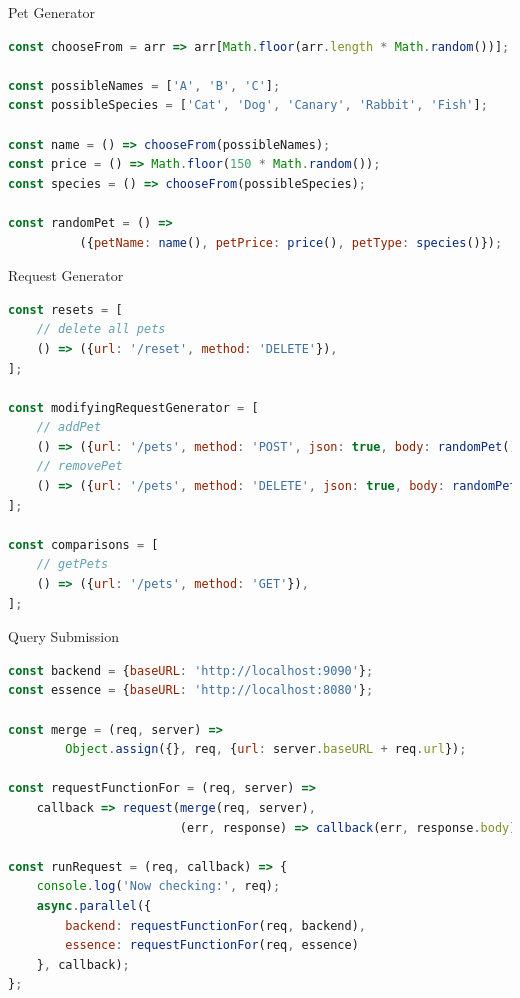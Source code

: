 \begin{frame}[fragile]{Pet Generator}

\begin{lstlisting}[language=JavaScript]
const chooseFrom = arr => arr[Math.floor(arr.length * Math.random())];

const possibleNames = ['A', 'B', 'C'];
const possibleSpecies = ['Cat', 'Dog', 'Canary', 'Rabbit', 'Fish'];

const name = () => chooseFrom(possibleNames);
const price = () => Math.floor(150 * Math.random());
const species = () => chooseFrom(possibleSpecies);

const randomPet = () => 
          ({petName: name(), petPrice: price(), petType: species()});
\end{lstlisting}

\end{frame}

\begin{frame}[fragile]{Request Generator}

\begin{lstlisting}[language=JavaScript]
const resets = [
    // delete all pets
    () => ({url: '/reset', method: 'DELETE'}),
];

const modifyingRequestGenerator = [
    // addPet
    () => ({url: '/pets', method: 'POST', json: true, body: randomPet()}),
    // removePet
    () => ({url: '/pets', method: 'DELETE', json: true, body: randomPet()})
];

const comparisons = [
    // getPets
    () => ({url: '/pets', method: 'GET'}),
];
\end{lstlisting}

\end{frame}

\begin{frame}[fragile]{Query Submission}

\begin{lstlisting}[language=JavaScript]
const backend = {baseURL: 'http://localhost:9090'};
const essence = {baseURL: 'http://localhost:8080'};

const merge = (req, server) => 
        Object.assign({}, req, {url: server.baseURL + req.url});

const requestFunctionFor = (req, server) =>
    callback => request(merge(req, server), 
                        (err, response) => callback(err, response.body));

const runRequest = (req, callback) => {
    console.log('Now checking:', req);
    async.parallel({
        backend: requestFunctionFor(req, backend),
        essence: requestFunctionFor(req, essence)
    }, callback);
};
\end{lstlisting}

\end{frame}

